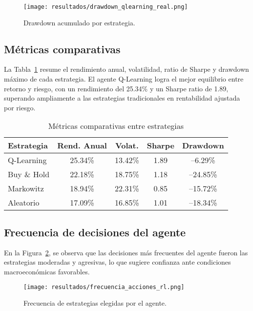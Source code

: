 \documentclass[conference]{IEEEtran}
\begin{document}
	\begin{figure}[ht]
		\centering
		\texttt{[image: resultados/drawdown\_qlearning\_real.png]}
		\caption{Drawdown acumulado por estrategia.}
		\label{fig:drawdown}
	\end{figure}
	
	\subsection{Métricas comparativas}
	
	La Tabla~\ref{tab:metricas} resume el rendimiento anual, volatilidad, ratio de Sharpe y drawdown máximo de cada estrategia. El agente Q-Learning logra el mejor equilibrio entre retorno y riesgo, con un rendimiento del 25.34\% y un Sharpe ratio de 1.89, superando ampliamente a las estrategias tradicionales en rentabilidad ajustada por riesgo.
	
	\begin{table}[ht]
		\caption{Métricas comparativas entre estrategias}
		\centering
		\begin{tabular}{lcccc}
			\hline
			\textbf{Estrategia} & \textbf{Rend. Anual} & \textbf{Volat.} & \textbf{Sharpe} & \textbf{Drawdown} \\
			\hline
			Q-Learning & 25.34\% & 13.42\% & 1.89 & --6.29\% \\
			Buy \& Hold & 22.18\% & 18.75\% & 1.18 & --24.85\% \\
			Markowitz & 18.94\% & 22.31\% & 0.85 & --15.72\% \\
			Aleatorio & 17.09\% & 16.85\% & 1.01 & --18.34\% \\
			\hline
		\end{tabular}
		\label{tab:metricas}
	\end{table}
	
	\subsection{Frecuencia de decisiones del agente}
	
	En la Figura~\ref{fig:frecuencia}, se observa que las decisiones más frecuentes del agente fueron las estrategias moderadas y agresivas, lo que sugiere confianza ante condiciones macroeconómicas favorables.
	
	\begin{figure}[ht]
		\centering
		\texttt{[image: resultados/frecuencia\_acciones\_rl.png]}
		\caption{Frecuencia de estrategias elegidas por el agente.}
		\label{fig:frecuencia}
	\end{figure}
	
\end{document}
